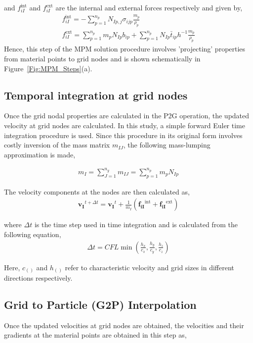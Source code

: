 and $f_{i I}^{\mathrm{int}}$ and $f_{i I}^{\mathrm{ext}}$ are the internal and external forces respectively and given by,
\begin{align}
f_{i I}^{\mathrm{int}}=-\sum_{p=1}^{n_p} N_{I p, j} \sigma_{i j p} \frac{m_p}{\rho_p} \\
f_{i I}^{\mathrm{ext}}=\sum_{p=1}^{n_p} m_p N_{I p} b_{i p}+\sum_{p=1}^{n_p} N_{I p} \bar{t}_{i p} h^{-1} \frac{m_p}{\rho_p}
\end{align}
Hence, this step of the MPM solution procedure involves 'projecting' properties from  material points to grid nodes and is shown schematically in Figure~\ref{Fig:MPM_Steps}(a).

\subsection{Temporal integration at grid nodes}
Once the grid nodal properties are calculated in the P2G operation, the updated velocity at grid nodes are calculated. In this study, a simple forward Euler time integration procedure is used. Since this procedure in its original form involves costly inversion of the mass matrix $m_{I J}$, the following mass-lumping approximation is made,

\begin{align}
m_I=\sum_{J=1}^{n_g} m_{I J}=\sum_{p=1}^{n_p} m_p N_{I p}
\end{align}

The velocity components at the nodes are then calculated as,
\begin{align}
\mathbf{v_{I}}^{t+\Delta t}=\mathbf{v_{I}}^{t}+\frac{1}{m_I} \left(\mathbf{f_{i I}}^{\mathrm{int}}+\mathbf{f_{i I}}^{\mathrm{ext}}\right)
\end{align}

where $\Delta t$ is the time step used in time integration and is calculated from the following equation,
\begin{align}
\Delta t= CFL \min \left(\frac{h_x}{c_x}, \frac{h_y}{c_y}, \frac{h_z}{c_z}\right)
\end{align}

Here, $c_()$ and $h_()$ refer to characteristic velocity and grid sizes in different directions respectively.

\subsection{Grid to Particle (G2P) Interpolation}
Once the updated velocities at grid nodes are obtained, the velocities and their gradients at the material points are obtained in this step as, 

